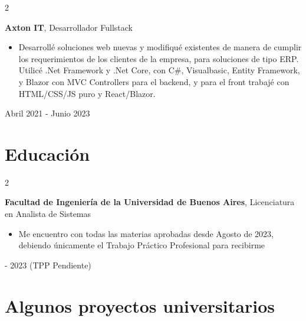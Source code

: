 \documentclass[10pt, letterpaper]{article}
\newenvironment{highlights}{
    \begin{itemize}[
        topsep=0.10 cm,
        parsep=0.10 cm,
        partopsep=0pt,
        itemsep=0pt,
        leftmargin=0.4 cm + 10pt
    ]
}{
    \end{itemize}
} %
\newenvironment{twocolentry}[2][]{
    \onecolentry
    \def\secondColumn{#2}
    \setcolumnwidth{\fill, 4.5 cm}
    \begin{paracol}{2}
}{
    \switchcolumn \raggedleft \secondColumn
    \end{paracol}
    \endonecolentry
} %
\begin{document}
        \begin{twocolentry}{

        Abril 2021 - Junio 2023
        }
            \textbf{Axton IT}, Desarrollador Fullstack
            \begin{highlights}
                \item Desarrollé soluciones web nuevas y modifiqué existentes de manera de cumplir los requerimientos de los clientes de la empresa, para soluciones de tipo ERP. Utilicé .Net Framework y .Net Core, con C\#, Visualbasic, Entity Framework, y Blazor con MVC Controllers para el backend, y para el front trabajé con HTML/CSS/JS puro y React/Blazor.
            \end{highlights}
        \end{twocolentry}


    \section{Educación}
        
        \begin{twocolentry}{2015 - 2023 (TPP Pendiente)}
            \textbf{Facultad de Ingeniería de la Universidad de Buenos Aires}, Licenciatura en Analista de Sistemas
            \begin{highlights}
                \item Me encuentro con todas las materias aprobadas desde Agosto de 2023, debiendo únicamente el Trabajo Práctico Profesional para recibirme
            \end{highlights}
        \end{twocolentry}

    
    \section{Algunos proyectos universitarios}
\end{document}
